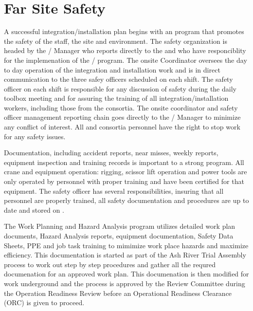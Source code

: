 \section{Far Site Safety}
\label{sec:far_site_safety}

A successful integration/installation plan begins with an 
program that promotes the safety of the staff, the  site
and environment. The safety organization is headed by the
/  Manager who reports directly to
the  and  who have responciblity for the
implemenation of the /  program.
The onsite   Coordinator oversees the day to
day operation of the integration and installation work and is in
direct communication to the three safey officers scheduled on each
shift.  The safety officer on each shift is responsible for any
discussion of safety during the daily toolbox meeting and for assuring
the training of all integration/installation workers, including those
from the consortia.  The onsite   coordinator
and safety officer management reporting chain goes directly to the
/  Manager to minimize any conflict
of interest. All  and consortia personnel have the right to
stop work for any safety issues.

Documentation, including accident reports, near misses, weekly
reports, equipment inspection and training records is important to a
strong  program. All crane and equipment operation:
rigging, scissor lift operation and power tools are only operated by
personnel with proper training and have been certified for that
equipment. The safety officer has several responsibilities, insuring
that all personnel are properly trained, all safety documentation and
procedures are up to date and stored on .

The Work Planning and Hazard Analysis program utilizes detailed work
plan documents, Hazard Analysis reports, equipment documentation,
Safety Data Sheets, PPE and job task training to mimimize work place
hazards and maximize efficiency.  This documentation is started as
part of the Ash River Trial Assembly process to work out step by step
procedures and gather all the requred documenation for an approved
work plan.  This documenation is then modified for work underground
and the process is approved by the   Review
Committee during the Operation Readiness Review before an Operational
Readiness Clearance (ORC) is given to proceed.


